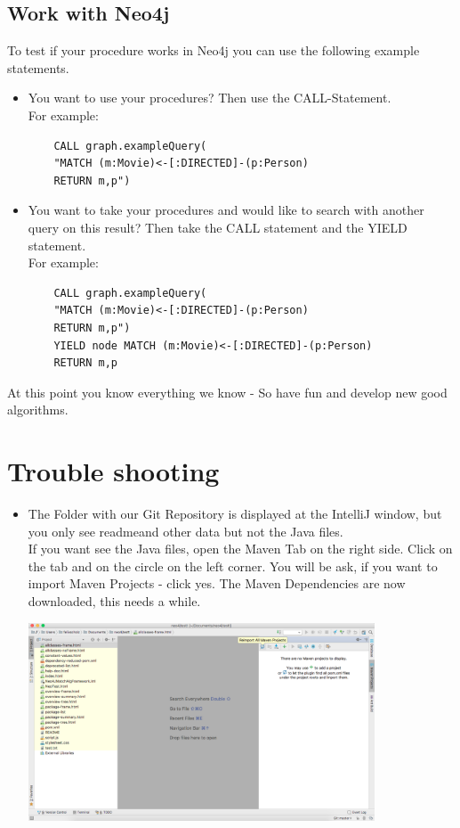 \section{Work with Neo4j}\label{sec:takeneo4j}
To test if your procedure works in Neo4j you can use the following example statements.
\begin{itemize}
	\item You want to use your procedures? Then use the CALL-Statement.\\
	For example:
	\begin{lstlisting}
	CALL graph.exampleQuery(
	"MATCH (m:Movie)<-[:DIRECTED]-(p:Person) 
	RETURN m,p")
	\end{lstlisting}
	\item You want to take your procedures and would like to search with another query on this result? Then take the CALL statement and the YIELD statement. \\
	For example:
	
	\begin{lstlisting}
	CALL graph.exampleQuery(
	"MATCH (m:Movie)<-[:DIRECTED]-(p:Person)
	RETURN m,p") 
	YIELD node MATCH (m:Movie)<-[:DIRECTED]-(p:Person)
	RETURN m,p
	\end{lstlisting}
\end{itemize}
At this point you know everything we know - So have fun and develop new good algorithms.
\newpage

\chapter{Trouble shooting} \label{chap:trouble}

\begin{itemize}
	\item 
		The Folder with our \glqq Git Repository\grqq{} is displayed at the \glqq IntelliJ\grqq{} window, but you only see \glqq readme\grqq{}and other data but not the Java files. \\
		If you want see the Java files, open the Maven Tab on the right side. Click on the tab and on the circle on the left corner. You will be ask, if you want to \glqq import Maven Projects\grqq{} - click \glqq yes\grqq{}. The \glqq Maven Dependencies\grqq{} are now downloaded, this needs a while.
		\begin{center}
			\includegraphics[width=10.3cm]{common/MavenImport.png}\setlength{\unitlength}{1mm}
		\end{center}
\end{itemize}
